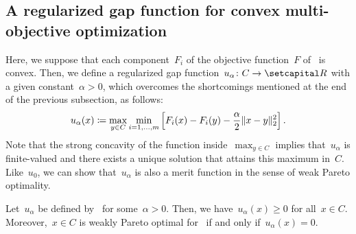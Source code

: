 \documentclass[../../main]{subfiles}
\begin{document}
\subsection{A regularized gap function for convex multi-objective optimization} 
Here, we suppose that each component~$F_i$ of the objective function~$F$ of~ is convex.
Then, we define a regularized gap function~$u_\alpha \colon C \to \setR$ with a given constant~$\alpha > 0$, which overcomes the shortcomings mentioned at the end of the previous subsection, as follows:
\begin{equation} \label{eq:reg_gap_MO}
    u_\alpha(x) \coloneqq \max_{y \in C} \min_{i = 1, \dots, m} \left[ F_i(x) - F_i(y) - \frac{\alpha}{2}\lVert x - y\rVert_2^2 \right] 
.\end{equation} 
Note that the strong concavity of the function inside~$\max_{y \in C}$ implies that~$u_\alpha$ is finite-valued and there exists a unique solution that attains this maximum in~$C$.
Like~$u_0$, we can show that~$u_\alpha$ is also a merit function in the sense of weak Pareto optimality.
\begin{theorem} 
    Let~$u_\alpha$ be defined by~ for some~$\alpha > 0$.
    Then, we have~$u_\alpha(x) \ge 0$ for all~$x \in C$.
    Moreover,~$x \in C$ is weakly Pareto optimal for~ if and only if~$u_\alpha(x) = 0$.
\end{theorem}
\end{document}
